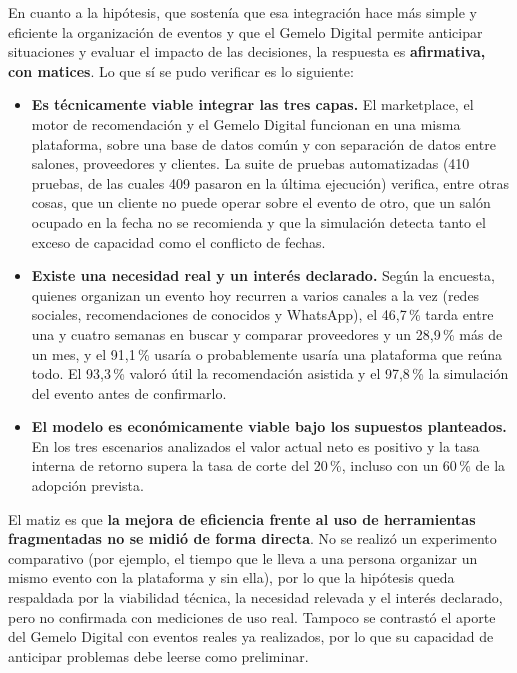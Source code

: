 En cuanto a la hipótesis, que sostenía que esa integración hace más
simple y eficiente la organización de eventos y que el Gemelo Digital
permite anticipar situaciones y evaluar el impacto de las decisiones, la
respuesta es \textbf{afirmativa, con matices}. Lo que sí se pudo verificar
es lo siguiente:

\begin{itemize}
    \item \textbf{Es técnicamente viable integrar las tres capas.} El
          marketplace, el motor de recomendación y el Gemelo Digital
          funcionan en una misma plataforma, sobre una base de datos
          común y con separación de datos entre salones, proveedores y
          clientes. La suite de pruebas automatizadas (410 pruebas, de las
          cuales 409 pasaron en la última ejecución) verifica, entre otras cosas, que un cliente no puede
          operar sobre el evento de otro, que un salón ocupado en la
          fecha no se recomienda y que la simulación detecta tanto el
          exceso de capacidad como el conflicto de fechas.
    \item \textbf{Existe una necesidad real y un interés declarado.} Según
          la encuesta, quienes organizan un evento hoy recurren a varios
          canales a la vez (redes sociales, recomendaciones de conocidos y
          WhatsApp), el 46,7\,\% tarda entre una y cuatro semanas en buscar
          y comparar proveedores y un 28,9\,\% más de un mes, y el 91,1\,\%
          usaría o probablemente usaría una plataforma que reúna todo. El
          93,3\,\% valoró útil la recomendación asistida y el 97,8\,\% la
          simulación del evento antes de confirmarlo.
    \item \textbf{El modelo es económicamente viable bajo los supuestos
          planteados.} En los tres escenarios analizados el valor actual
          neto es positivo y la tasa interna de retorno supera la tasa de
          corte del 20\,\%, incluso con un 60\,\% de la adopción prevista.
\end{itemize}

El matiz es que \textbf{la mejora de eficiencia frente al uso de
herramientas fragmentadas no se midió de forma directa}. No se realizó un
experimento comparativo (por ejemplo, el tiempo que le lleva a una
persona organizar un mismo evento con la plataforma y sin ella), por lo
que la hipótesis queda respaldada por la viabilidad técnica, la
necesidad relevada y el interés declarado, pero no confirmada con
mediciones de uso real. Tampoco se contrastó el aporte del Gemelo Digital
con eventos reales ya realizados, por lo que su capacidad de anticipar
problemas debe leerse como preliminar.


